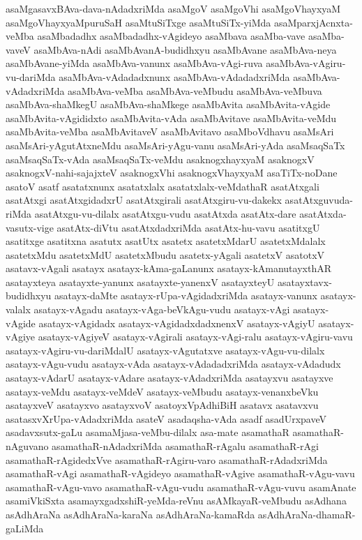 {asaMgasavxBAva-dava-nAdadxriMda
asaMgoV
asaMgoVhi
asaMgoVhayxyaM
asaMgoVhayxyaMpuruSaH
asaMtuSiTxge
asaMtuSiTx-yiMda
asaMparxjAcnxta-veMba
asaMbadadhx
asaMbadadhx-vAgideyo
asaMbava
asaMba-vave
asaMba-vaveV
asaMbAva-nAdi
asaMbAvanA-budidhxyu
asaMbAvane
asaMbAva-neya
asaMbAvane-yiMda
asaMbAva-vanunx
asaMbAva-vAgi-ruva
asaMbAva-vAgiru-vu-dariMda
asaMbAva-vAdadadxnunx
asaMbAva-vAdadadxriMda
asaMbAva-vAdadxriMda
asaMbAva-veMba
asaMbAva-veMbudu
asaMbAva-veMbuva
asaMbAva-shaMkegU
asaMbAva-shaMkege
asaMbAvita
asaMbAvita-vAgide
asaMbAvita-vAgididxto
asaMbAvita-vAda
asaMbAvitave
asaMbAvita-veMdu
asaMbAvita-veMba
asaMbAvitaveV
asaMbAvitavo
asaMboVdhavu
asaMsAri
asaMsAri-yAgutAtxneMdu
asaMsAri-yAgu-vanu
asaMsAri-yAda
asaMsaqSaTx
asaMsaqSaTx-vAda
asaMsaqSaTx-veMdu
asaknogxhayxyaM
asaknogxV
asaknogxV-nahi-sajajxteV
asaknogxVhi
asaknogxVhayxyaM
asaTiTx-noDane
asatoV
asatf
asatatxnunx
asatatxlalx
asatatxlalx-veMdathaR
asatAtxgali
asatAtxgi
asatAtxgidadxrU
asatAtxgirali
asatAtxgiru-vu-dakekx
asatAtxguvuda-riMda
asatAtxgu-vu-dilalx
asatAtxgu-vudu
asatAtxda
asatAtx-dare
asatAtxda-vasutx-vige
asatAtx-diVtu
asatAtxdadxriMda
asatAtx-hu-vavu
asatitxgU
asatitxge
asatitxna
asatutx
asatUtx
asatetx
asatetxMdarU
asatetxMdalalx
asatetxMdu
asatetxMdU
asatetxMbudu
asatetx-yAgali
asatetxV
asatotxV
asatavx-vAgali
asatayx
asatayx-kAma-gaLanunx
asatayx-kAmanutayxthAR
asatayxteya
asatayxte-yanunx
asatayxte-yanenxV
asatayxteyU
asatayxtavx-budidhxyu
asatayx-daMte
asatayx-rUpa-vAgidadxriMda
asatayx-vanunx
asatayx-valalx
asatayx-vAgadu
asatayx-vAga-beVkAgu-vudu
asatayx-vAgi
asatayx-vAgide
asatayx-vAgidadx
asatayx-vAgidadxdadxnenxV
asatayx-vAgiyU
asatayx-vAgiye
asatayx-vAgiyeV
asatayx-vAgirali
asatayx-vAgi-ralu
asatayx-vAgiru-vavu
asatayx-vAgiru-vu-dariMdalU
asatayx-vAgutatxve
asatayx-vAgu-vu-dilalx
asatayx-vAgu-vudu
asatayx-vAda
asatayx-vAdadadxriMda
asatayx-vAdadudx
asatayx-vAdarU
asatayx-vAdare
asatayx-vAdadxriMda
asatayxvu
asatayxve
asatayx-veMdu
asatayx-veMdeV
asatayx-veMbudu
asatayx-venanxbeVku
asatayxveV
asatayxvo
asatayxvoV
asatoyxVpAdhiBiH
asatavx
asatavxvu
asatasxvXrUpa-vAdadxriMda
asateV
asadaqsha-vAda
asadf
asadUrxpaveV
asadavxsutx-gaLu
asamaMjasa-veMbu-dilalx
asa-mate
asamathaR
asamathaR-nAguvano
asamathaR-nAdadxriMda
asamathaR-rAgalu
asamathaR-rAgi
asamathaR-rAgidedxVve
asamathaR-rAgiru-varo
asamathaR-rAdadxriMda
asamathaR-vAgi
asamathaR-vAgideyo
asamathaR-vAgive
asamathaR-vAgu-vavu
asamathaR-vAgu-vavo
asamathaR-vAgu-vudu
asamathaR-vAgu-vuvu
asamAnate
asamiVkiSxta
asamayxgadxshiR-yeMda-reVnu
asAMkayaR-veMbudu
asAdhana
asAdhAraNa
asAdhAraNa-karaNa
asAdhAraNa-kamaRda
asAdhAraNa-dhamaR-gaLiMda
}
